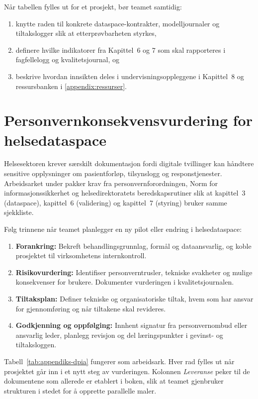 Når tabellen fylles ut for et prosjekt, bør teamet samtidig:
\begin{enumerate}[label=\alph*.]
    \item knytte raden til konkrete dataspace-kontrakter, modelljournaler og tiltakslogger slik at etterprøvbarheten styrkes,\citep{dfo2024internkontroll}
    \item definere hvilke indikatorer fra Kapittel~6 og \nobreakspace{}7 som skal rapporteres i fagfellelogg og kvalitetsjournal, og
    \item beskrive hvordan innsikten deles i undervisningsoppleggene i Kapittel~8 og ressursbanken i \autoref{appendix:ressurser}.
\end{enumerate}

\section{Personvernkonsekvensvurdering for helsedataspace}
Helsesektoren krever særskilt dokumentasjon fordi digitale tvillinger kan håndtere
sensitive opplysninger om pasientforløp, tilsynslogg og responstjenester. Arbeidsarket under
pakker krav fra personvernforordningen, Norm for informasjonssikkerhet og helsedirektoratets
beredskapsrutiner slik at kapittel~3 (dataspace), kapittel~6 (validering) og kapittel~7 (styring)
bruker samme sjekkliste.\citep{datatilsynet2023dpia,norm2023,helsedir2023beredskap}

Følg trinnene når teamet planlegger en ny pilot eller endring i helsedataspace:

\begin{enumerate}[label=\alph*.]
    \item \textbf{Forankring:} Bekreft behandlingsgrunnlag, formål og dataansvarlig, og koble
    prosjektet til virksomhetens internkontroll.
    \item \textbf{Risikovurdering:} Identifiser personverntrusler, tekniske svakheter og mulige
    konsekvenser for brukere. Dokumenter vurderingen i kvalitetsjournalen.
    \item \textbf{Tiltaksplan:} Definer tekniske og organisatoriske tiltak, hvem som har ansvar for
    gjennomføring og når tiltakene skal revideres.
    \item \textbf{Godkjenning og oppfølging:} Innhent signatur fra personvernombud eller ansvarlig
    leder, planlegg revisjon og del læringspunkter i gevinst- og tiltaksloggen.
\end{enumerate}

Tabell~\ref{tab:appendiks-dpia} fungerer som arbeidsark. Hver rad fylles ut når prosjektet går
inn i et nytt steg av vurderingen. Kolonnen \emph{Leveranse} peker til de dokumentene som allerede
er etablert i boken, slik at teamet gjenbruker strukturen i stedet for å opprette parallelle
maler.

